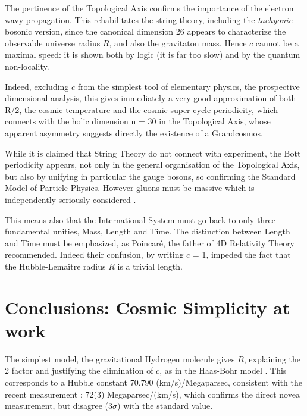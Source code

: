 \documentclass[twoside,draft]{article}
\begin{document}
\begin{sloppypar}
The pertinence of the Topological Axis confirms
the importance of the electron wavy propagation. This rehabilitates the string theory, including the
\textit{tachyonic} bosonic version, since the canonical dimension 26 appears to characterize the observable
universe radius $R$, and also the gravitaton mass. Hence $c$ cannot be a maximal speed: it is shown both by
logic (it is far too slow) and by the quantum non-locality.

Indeed, excluding $c$ from the simplest tool of elementary physics, the prospective dimensional
analysis, this gives immediately a very good approximation of both R/2, the cosmic temperature and the cosmic super-cycle periodicity, which connects with the holic dimension n = 30 in the
Topological Axis, whose apparent asymmetry suggests directly the existence of a Grandcosmos.

While it is claimed that String Theory do not connect with experiment, the Bott periodicity
appears, not only in the general organisation of the Topological Axis, but also by unifying in particular the gauge bosons, so confirming the Standard Model of Particle Physics. However gluons must be massive which is independently seriously considered \cite{Larin}.

This means also that the International System must go back to only three fundamental unities,
Mass, Length and Time. The distinction between Length and Time must be emphasized, as
Poincar\'{e}, the father of 4D Relativity Theory recommended. Indeed their confusion, by writing $c$ =
1, impeded the fact that the Hubble-Lema\^{i}tre radius $R$ is a trivial length.


\section {Conclusions: Cosmic Simplicity at work}
The simplest model, the gravitational Hydrogen molecule gives $R$, explaining the 2 factor and
justifying the elimination of $c$, as in the Haas-Bohr model \cite{Sanchez1}. This corresponds to a Hubble constant 70.790
(km/s)/Megaparsec, consistent with the recent measurement \cite{Bonvin}: 72(3) Megaparsec/(km/s), which
confirms the direct novea measurement, but disagree (3$\sigma$) with the standard value.


\end{sloppypar}
\end{document}
